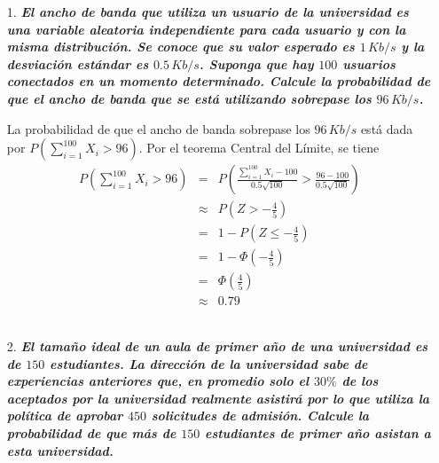 \documentclass[a4paper,11pt]{article}
\begin{document}
\begin{itemize}

\item[1.] \textit{\bfseries El ancho de banda que utiliza un usuario de la universidad es una variable aleatoria independiente para cada usuario y con  la misma distribuci\'on. Se conoce que su valor esperado es $1\,Kb/s$ y la desviaci\'on est\'andar es $0.5\,Kb/s$. Suponga que hay $100$ usuarios conectados en un momento determinado. Calcule la probabilidad de que el ancho de banda que se est\'a utilizando sobrepase los $96\,Kb/s$.}\\

\par La probabilidad de que el ancho de banda sobrepase los $96\,Kb/s$ est\'a dada por $P\left(\displaystyle\sum_{i=1}^{100}{X_i}> 96\right)$. Por el teorema Central del L\'imite, se tiene
\begin{eqnarray}
P\left(\displaystyle\sum_{i=1}^{100}{X_i}> 96\right)&=&P\left(\frac{\displaystyle\sum_{i=1}^{100}{X_i}-100}{0.5\sqrt{100}}> \frac{96-100}{0.5\sqrt{100}}\right)\nonumber\\
&\approx&P\left(Z>-\frac{4}{5}\right)\nonumber\\
&=&1-P\left(Z\leq -\frac{4}{5}\right)\nonumber\\
&=&1-\Phi\left(-\frac{4}{5}\right)\nonumber\\
&=&\Phi\left(\frac{4}{5}\right)\nonumber\\
&\approx&0.79\nonumber
\end{eqnarray}\\



\item[2.] \textit{\bfseries El tama\~no ideal de un aula de primer a\~no de una universidad es de $150$ estudiantes. La direcci\'on de la universidad sabe de experiencias anteriores que, en promedio solo el $30\%$ de los aceptados por la universidad realmente asistir\'a por lo que utiliza la pol\'itica de aprobar $450$ solicitudes de admisi\'on. Calcule la probabilidad de que m\'as de $150$ estudiantes de primer a\~no asistan a esta universidad.}\\


\end{itemize}
\end{document}
